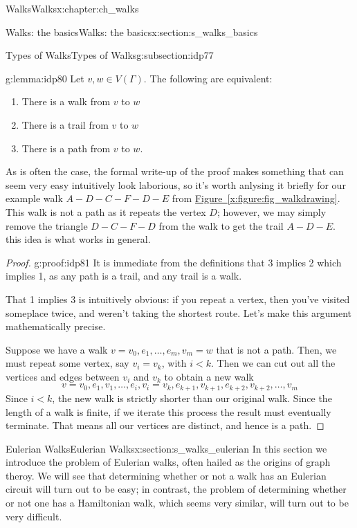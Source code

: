 \documentclass[oneside,10pt,]{book}
\newcommand{\xreffont}{\relax}
\numberwithin{equation}{section}
\newcommand{\lt}{<}
\begin{document}
\begin{chapterptx}{Walks}{}{Walks}{}{}{x:chapter:ch_walks}
\begin{sectionptx}{Walks: the basics}{}{Walks: the basics}{}{}{x:section:s_walks_basics}
\begin{subsectionptx}{Types of Walks}{}{Types of Walks}{}{}{g:subsection:idp77}
\begin{lemma}{}{}{g:lemma:idp80}
Let \(v,w\in V(\Gamma)\).  The following are equivalent:%
%
\begin{enumerate}
\item{}There is a walk from \(v\) to \(w\)%
\item{}There is a trail from \(v\) to \(w\)%
\item{}There is a path from \(v\) to \(w\).%
\end{enumerate}
\end{lemma}
As is often the case, the formal write-up of the proof makes something that can seem very easy intuitively look laborious, so it's worth anlysing it briefly for our example walk \(A-D-C-F-D-E\) from \hyperref[x:figure:fig_walkdrawing]{Figure~{\xreffont\ref{x:figure:fig_walkdrawing}}}.  This walk is not a path as it repeats the vertex \(D\); however, we may simply remove the triangle \(D-C-F-D\) from the walk to get the trail \(A-D-E\).  this idea is what works in general.%
\begin{proof}{}{g:proof:idp81}
It is immediate from the definitions that 3 implies 2 which implies 1, as any path is a trail, and any trail is a walk.%
\par
That 1 implies 3 is intuitively obvious: if you repeat a vertex, then you've visited someplace twice, and weren't taking the shortest route.  Let's make this argument mathematically precise.%
\par
Suppose we have a walk \(v=v_0,e_1,\dots, e_m, v_m=w\) that is not a path.  Then, we must repeat some vertex, say \(v_i=v_k\), with \(i\lt k\).  Then we can cut out all the vertices and edges between \(v_i\) and \(v_k\) to obtain a new walk%
%
\begin{equation*}
v=v_0,e_1, v_1,\dots, e_i, v_i=v_k, e_{k+1}, v_{k+1}, e_{k+2}, v_{k+2}, \dots, v_m
\end{equation*}
Since \(i \lt k \), the new walk is strictly shorter than our original walk.  Since the length of a walk is finite, if we iterate this process the result must eventually terminate.  That means all our vertices are distinct, and hence is a path.%
\end{proof}
\end{subsectionptx}
\end{sectionptx}
%
%
\typeout{************************************************}
\typeout{************************************************}
%
\begin{sectionptx}{Eulerian Walks}{}{Eulerian Walks}{}{}{x:section:s_walks_eulerian}
In this section we introduce the problem of Eulerian walks, often hailed as the origins of graph theroy. We will see that determining whether or not a walk has an Eulerian circuit will turn out to be easy; in contrast, the problem of determining whether or not one has a Hamiltonian walk, which seems very similar, will turn out to be very difficult.%

\end{sectionptx}
\end{chapterptx}
\end{document}
